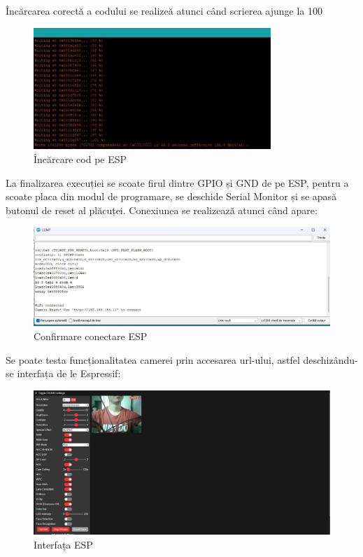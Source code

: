 \documentclass{report}
\begin{document}
Încărcarea corectă a codului se realizeă atunci când scrierea ajunge la 100%
\begin{figure}[H]
    \centering
    \includegraphics[width=0.8\textwidth]{scriere_data.jpg}
    \caption{Încărcare cod pe ESP}
    \label{scriere_data}
\end{figure} 

La finalizarea execuției se scoate firul dintre GPIO și GND de pe ESP, pentru a scoate placa din modul de programare, se deschide Serial Monitor și se apasă butonul de reset al plăcuței. Conexiunea se realizează atunci când apare:
\newpage
\vspace*{1cm}
\begin{figure}[H]
    \centering
    \includegraphics[width=1\textwidth]{confirmare_conexiune.jpg}
    \caption{Confirmare conectare ESP}
    \label{confirmare_conexiune}
\end{figure} 

Se poate testa funcționalitatea camerei prin accesarea url-ului, astfel deschizându-se interfața de le Espressif:
\begin{figure}[H]
    \centering
    \includegraphics[width=1\textwidth]{interfata_ESP.jpg}
    \caption{Interfața ESP}
    \label{interfata_ESP}
\end{figure} 
\end{document}
